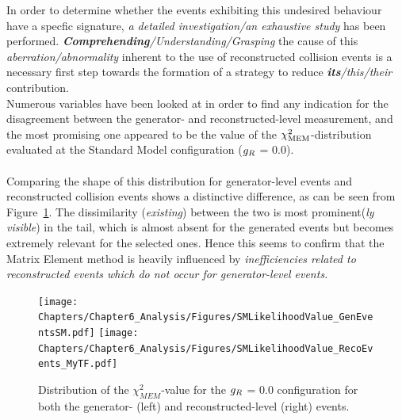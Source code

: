 In order to determine whether the events exhibiting this undesired behaviour have a specfic signature, \textit{a detailed investigation/an exhaustive study} has been performed.
\textit{\textbf{Comprehending}/Understanding/Grasping} the cause of this \textit{aberration/abnormality} inherent to the use of reconstructed collision events is a necessary first step towards the formation of a strategy to reduce \textit{\textbf{its}/this/their} contribution.
\\
Numerous variables have been looked at in order to find any indication for the disagreement between the generator- and reconstructed-level measurement, and the most promising one appeared to be the value of the $\chi^{2}_{\textrm{MEM}}$-distribution evaluated at the Standard Model configuration ($g_{R}$ = 0.0).
\\
\\
Comparing the shape of this distribution for generator-level events and reconstructed collision events shows a distinctive difference, as can be seen from Figure~\ref{fig::SMLik}.
The dissimilarity (\textit{existing}) between the two is most prominent(\textit{ly visible}) in the tail, which is almost absent for the generated events but becomes extremely relevant for the selected ones.
Hence this seems to confirm that the Matrix Element method is heavily influenced by \textit{inefficiencies related to reconstructed events which do not occur for generator-level events.}
\\
\begin{figure}[h!t]
 \centering
 \texttt{[image: Chapters/Chapter6\_Analysis/Figures/SMLikelihoodValue\_GenEventsSM.pdf]} \hspace{0.3cm}
 \texttt{[image: Chapters/Chapter6\_Analysis/Figures/SMLikelihoodValue\_RecoEvents\_MyTF.pdf]}
 \caption{Distribution of the $\chi^{2}_{MEM}$-value for the $g_{R}$ = $0.0$ configuration for both the generator- (left) and reconstructed-level (right) events.} \label{fig::SMLik}
\end{figure}
%

